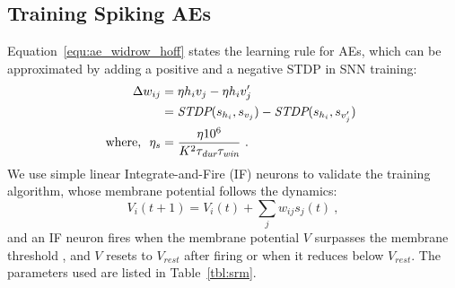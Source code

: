 \subsection[Spiking AEs]{Training Spiking AEs}
\label{subsec:exp_SAE}
Equation~\ref{equ:ae_widrow_hoff} states the learning rule for AEs, which can be approximated by adding a positive and a negative STDP in SNN training:
\begin{equation}
\label{equ:sae}
\begin{aligned}
	\Delta w_{ij} &= \eta h_i v_j - \eta h_i v'_j \\
	&= \textit{\textrm{STDP}}(s_{h_i}, s_{v_j}) - \textit{\textrm{STDP}}(s_{h_i}, s_{v'_j})~ \\
	\textrm{where,~~} \eta_{s} &=  \frac{\eta 10^6}{K^2 \tau_{\textit{\textrm{dur}}} \tau_{\textit{\textrm{win}}}}~.
\end{aligned} 
\end{equation}
We use simple linear Integrate-and-Fire (IF) neurons to validate the training algorithm, whose membrane potential follows the dynamics:
\begin{equation}
V_i(t+1)=V_i(t) + \sum_j w_{ij} s_j(t)~,
\end{equation}
and an IF neuron fires when the membrane potential $V$ surpasses the membrane threshold \DIFdelbegin {}\DIFdelend \DIFaddbegin {}\DIFaddend , and $V$ resets to $V_{rest}$ after firing or when it reduces below $V_{rest}$.
The parameters used are listed in Table~\ref{tbl:srm}.

